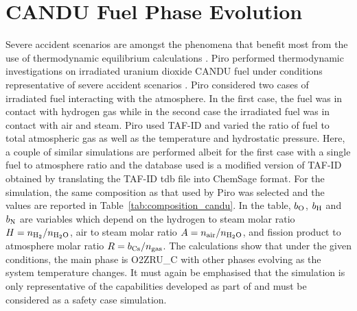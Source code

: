 \section{CANDU Fuel Phase Evolution}
Severe accident scenarios are amongst the phenomena that benefit most from the use of thermodynamic equilibrium calculations \cite{Piro:2021aa}. Piro performed thermodynamic investigations on irradiated uranium dioxide CANDU fuel under conditions representative of severe accident scenarios \cite{Piro:2022aa}. Piro considered two cases of irradiated fuel interacting with the atmosphere. In the first case, the fuel was in contact with hydrogen gas while in the second case the irradiated fuel was in contact with air and steam.  Piro used TAF-ID \cite{Gueneau15,Gueneau:2021aa} and varied the ratio of fuel to total atmospheric gas as well as the temperature and hydrostatic pressure. Here, a couple of similar simulations are performed albeit for the first case with a single fuel to atmosphere ratio and the database used is a modified version of TAF-ID obtained by translating the TAF-ID tdb file into ChemSage format. For the simulation, the same composition as that used by Piro was selected and the values are reported in Table~\ref{tab:composition_candu}. In the table, $b_{\ce{O}}$, $b_{\ce{H}}$ and $b_{\ce{N}}$ are variables which depend on the hydrogen to steam molar ratio $H = n_{\ce{H2}} / n_{\ce{H2O}}$, air to steam molar ratio $A = n_{\text{air}} / n_{\ce{H2O}}$, and fission product to atmosphere molar ratio $R = b_{\ce{Cs}} / n_{\text{gas}}$. The calculations show that under the given conditions, the main phase is O2ZRU\_C with other phases evolving as the system temperature changes. It must again be emphasised that the simulation is only representative of the capabilities developed as part of {\GEM} and must be considered as a safety case simulation. 
